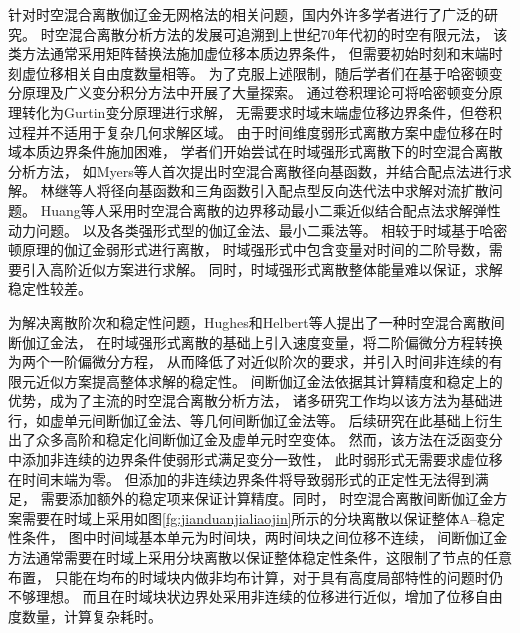 针对时空混合离散伽辽金无网格法的相关问题，国内外许多学者进行了广泛的研究。
时空混合离散分析方法的发展可追溯到上世纪70年代初的时空有限元法\cite{argyris1969}，
该类方法通常采用矩阵替换法施加虚位移本质边界条件，
但需要初始时刻和末端时刻虚位移相关自由度数量相等。
为了克服上述限制，随后学者们在基于哈密顿变分原理及广义变分积分方法中开展了大量探索\cite{baileyMethodRitzApplied1976,baileyNewLookHamiltons1975,baruchHamiltonsPrincipleHamiltons1982,gurtinVariationalPrinciplesLinear1964,gurtinVariationalPrinciplesLinear1964a,herreraSimplifiedVersionGurtin1974,friedFiniteelementAnalysisTimedependent1969,hodgesWeakHamiltonianFinite1991}。
通过卷积理论可将哈密顿变分原理转化为Gurtin变分原理进行求解，
无需要求时域末端虚位移边界条件\cite{Gurtin1992}，但卷积过程并不适用于复杂几何求解区域。
由于时间维度弱形式离散方案中虚位移在时域本质边界条件施加困难，
学者们开始尝试在时域强形式离散下的时空混合离散分析方法，
如Myers等人\cite{MYERS2002539}首次提出时空混合离散径向基函数，并结合配点法进行求解。
林继等人\cite{LIN2021125964}将径向基函数和三角函数引入配点型反向迭代法中求解对流扩散问题。
Huang等人\cite{HUANG202489}采用时空混合离散的边界移动最小二乘近似结合配点法求解弹性动力问题。
以及各类强形式型的伽辽金法\cite{LiFan2017}、最小二乘法\cite{epstein2024}等。
相较于时域基于哈密顿原理的伽辽金弱形式进行离散，
时域强形式中包含变量对时间的二阶导数，需要引入高阶近似方案进行求解。
同时，时域强形式离散整体能量难以保证，求解稳定性较差。

为解决离散阶次和稳定性问题，Hughes和Helbert等人提出了一种时空混合离散间断伽辽金法\cite{hughes1988}，
在时域强形式离散的基础上引入速度变量，将二阶偏微分方程转换为两个一阶偏微分方程，
从而降低了对近似阶次的要求，并引入时间非连续的有限元近似方案提高整体求解的稳定性。
间断伽辽金法依据其计算精度和稳定上的优势，成为了主流的时空混合离散分析方法，
诸多研究工作均以该方法为基础进行，如虚单元间断伽辽金法\cite{xu2025}、等几何间断伽辽金法\cite{saadeSpaceTimeIsogeometricAnalysis2021}等。
后续研究在此基础上衍生出了众多高阶和稳定化间断伽辽金及虚单元时空变体\cite{antoniettiCVEMDGSpacetimeMethod2023,antoniettiSpacetimeDiscontinuousGalerkin2020,bauseConvergenceContinuousGalerkin2024,farhatDiscontinuousGalerkinMethod2004,cangianiHpVersionDiscontinuousGalerkin2017,delfourDiscontinuousGalerkinMethods1981}。
然而，该方法在泛函变分中添加非连续的边界条件使弱形式满足变分一致性，
此时弱形式无需要求虚位移在时间末端为零。
但添加的非连续边界条件将导致弱形式的正定性无法得到满足，
需要添加额外的稳定项来保证计算精度。同时，
时空混合离散间断伽辽金方案需要在时域上采用如图\ref{fg:jianduanjialiaojin}所示的分块离散以保证整体A–稳定性条件\cite{hughes1988}，
图中时间域基本单元为时间块，两时间块之间位移不连续，
间断伽辽金方法通常需要在时域上采用分块离散以保证整体稳定性条件，这限制了节点的任意布置，
只能在均布的时域块内做非均布计算，对于具有高度局部特性的问题时仍不够理想。
而且在时域块状边界处采用非连续的位移进行近似，增加了位移自由度数量，计算复杂耗时。

